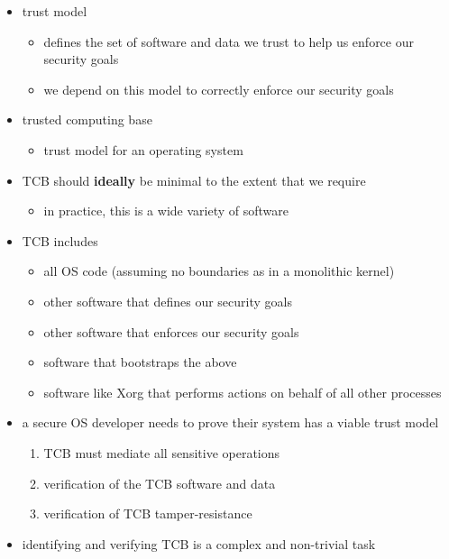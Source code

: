 \documentclass[
  12pt]{findlay}
\providecommand{\tightlist}{%
  \setlength{\itemsep}{0pt}\setlength{\parskip}{0pt}}
\begin{document}
\begin{itemize}
\tightlist
\item
  trust model

  \begin{itemize}
  \tightlist
  \item
    defines the set of software and data we trust to help us enforce our
    security goals
  \item
    we depend on this model to correctly enforce our security goals
  \end{itemize}
\item
  trusted computing base

  \begin{itemize}
  \tightlist
  \item
    trust model for an operating system
  \end{itemize}
\item
  TCB should \textbf{ideally} be minimal to the extent that we require

  \begin{itemize}
  \tightlist
  \item
    in practice, this is a wide variety of software
  \end{itemize}
\item
  TCB includes

  \begin{itemize}
  \tightlist
  \item
    all OS code (assuming no boundaries as in a monolithic kernel)
  \item
    other software that defines our security goals
  \item
    other software that enforces our security goals
  \item
    software that bootstraps the above
  \item
    software like Xorg that performs actions on behalf of all other
    processes
  \end{itemize}
\item
  a secure OS developer needs to prove their system has a viable trust
  model

  \begin{enumerate}
  \def\labelenumi{(\arabic{enumi})}
  \tightlist
  \item
    TCB must mediate all sensitive operations
  \item
    verification of the TCB software and data
  \item
    verification of TCB tamper-resistance
  \end{enumerate}
\item
  identifying and verifying TCB is a complex and non-trivial task
\end{itemize}
\end{document}
